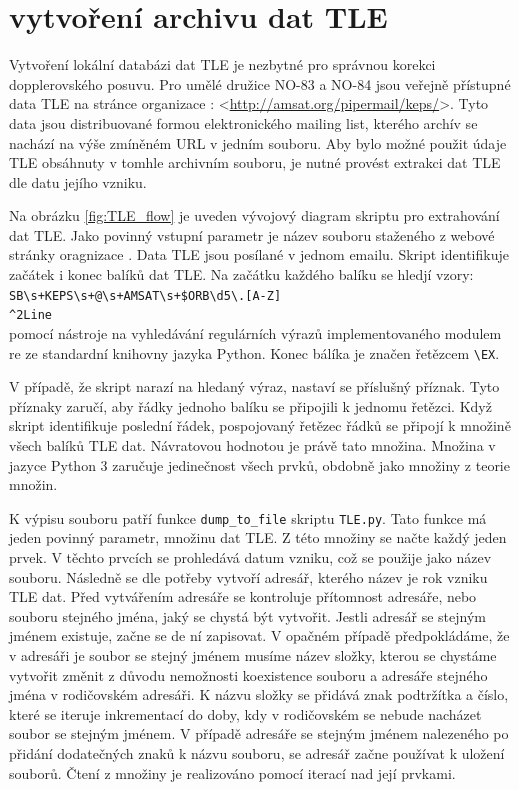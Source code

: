 \chapter{vytvoření archivu dat TLE}
  Vytvoření lokální databázi dat TLE je nezbytné pro správnou korekci dopplerovského posuvu. Pro umělé družice NO-83 a NO-84 jsou veřejně přístupné data TLE na stránce organizace : <\url{http://amsat.org/pipermail/keps/}>. Tyto data jsou distribuované formou elektronického mailing list, kterého archív se nachází na výše zmíněném URL v jedním souboru. Aby bylo možné použit údaje TLE obsáhnuty v tomhle archivním souboru, je nutné provést extrakci dat TLE dle datu jejího vzniku.

  Na obrázku \ref{fig:TLE_flow} je uveden vývojový diagram skriptu pro extrahování dat TLE. Jako povinný vstupní parametr je název souboru staženého z webové stránky oragnizace . Data TLE jsou posílané v jednom emailu. Skript identifikuje začátek i konec balíků dat TLE. Na začátku každého balíku se hledjí vzory:\\
  \texttt{SB\textbackslash s+KEPS\textbackslash s+@\textbackslash s+AMSAT\textbackslash s+\$ORB\textbackslash d{5}\textbackslash.[A-Z]}\\
  \texttt{\textasciicircum 2Line}\\
  pomocí nástroje na vyhledávání regulárních výrazů implementovaného modulem re ze standardní knihovny jazyka Python. Konec bálíka je značen řetězcem
  \texttt{\textbackslash EX}.

  V případě, že skript narazí na hledaný výraz, nastaví se příslušný příznak. Tyto příznaky zaručí, aby řádky jednoho balíku se připojili k jednomu řetězci. Když skript identifikuje poslední řádek, pospojovaný řetězec řádků se připojí k množině všech balíků TLE dat. Návratovou hodnotou je právě tato množina. Množina v jazyce Python 3 zaručuje jedinečnost všech prvků, obdobně jako množiny z teorie množin.

  K výpisu souboru patří funkce \texttt{dump\_to\_file} skriptu \texttt{TLE.py}. Tato funkce má jeden povinný parametr, množinu dat TLE. Z této množiny se načte každý jeden prvek. V těchto prvcích se prohledává datum vzniku, což se použije jako název souboru. Následně se dle potřeby vytvoří adresář, kterého název je rok vzniku TLE dat. Před vytvářením adresáře se kontroluje přítomnost adresáře, nebo souboru stejného jména, jaký se chystá být vytvořit. Jestli adresář se stejným jménem existuje, začne se de ní zapisovat. V opačném případě předpokládáme, že v adresáři je soubor se stejný jménem musíme název složky, kterou se chystáme vytvořit změnit z důvodu nemožnosti koexistence souboru a adresáře stejného jména v rodičovském adresáři. K názvu složky se přidává znak podtržítka a číslo, které se iteruje inkrementací do doby, kdy v rodičovském se nebude nacházet soubor se stejným jménem. V případě adresáře se stejným jménem nalezeného po přidání dodatečných znaků k názvu souboru, se adresář začne používat k uložení souborů. Čtení z množiny je realizováno pomocí iterací nad její prvkami.

